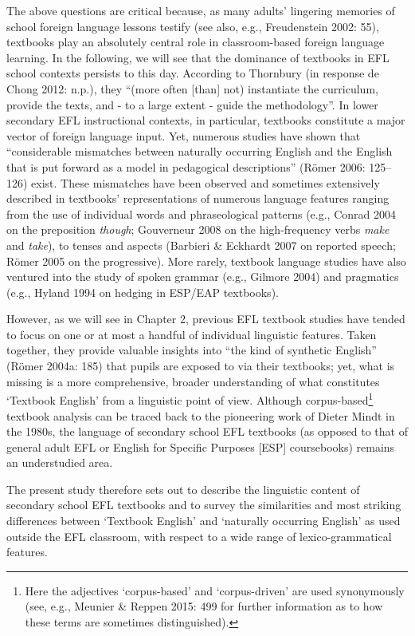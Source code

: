 \documentclass[
  letterpaper,
  DIV=11,
  numbers=noendperiod]{scrreprt}
\begin{document}
The above questions are critical because, as many adults' lingering
memories of school foreign language lessons testify (see also, e.g.,
Freudenstein 2002: 55), textbooks play an absolutely central role in
classroom-based foreign language learning. In the following, we will see
that the dominance of textbooks in EFL school contexts persists to this
day. According to Thornbury (in response de Chong 2012: n.p.), they
``(more often {[}than{]} not) instantiate the curriculum, provide the
texts, and - to a large extent - guide the methodology''. In lower
secondary EFL instructional contexts, in particular, textbooks
constitute a major vector of foreign language input. Yet, numerous
studies have shown that ``considerable mismatches between naturally
occurring English and the English that is put forward as a model in
pedagogical descriptions'' (Römer 2006: 125--126) exist. These
mismatches have been observed and sometimes extensively described in
textbooks' representations of numerous language features ranging from
the use of individual words and phraseological patterns (e.g., Conrad
2004 on the preposition \emph{though}; Gouverneur 2008 on the
high-frequency verbs \emph{make} and \emph{take}), to tenses and aspects
(Barbieri \& Eckhardt 2007 on reported speech; Römer 2005 on the
progressive). More rarely, textbook language studies have also ventured
into the study of spoken grammar (e.g., Gilmore 2004) and pragmatics
(e.g., Hyland 1994 on hedging in ESP/EAP textbooks).

However, as we will see in Chapter 2, previous EFL textbook studies have
tended to focus on one or at most a handful of individual linguistic
features. Taken together, they provide valuable insights into ``the kind
of synthetic English'' (Römer 2004a: 185) that pupils are exposed to via
their textbooks; yet, what is missing is a more comprehensive, broader
understanding of what constitutes `Textbook English' from a linguistic
point of view. Although corpus-based\footnote{Here the adjectives
  `corpus-based' and `corpus-driven' are used synonymously (see, e.g.,
  Meunier \& Reppen 2015: 499 for further information as to how these
  terms are sometimes distinguished).} textbook analysis can be traced
back to the pioneering work of Dieter Mindt in the 1980s, the language
of secondary school EFL textbooks (as opposed to that of general adult
EFL or English for Specific Purposes {[}ESP{]} coursebooks) remains an
understudied area.

The present study therefore sets out to describe the linguistic content
of secondary school EFL textbooks and to survey the similarities and
most striking differences between `Textbook English' and `naturally
occurring English' as used outside the EFL classroom, with respect to a
wide range of lexico-grammatical features.
\end{document}
